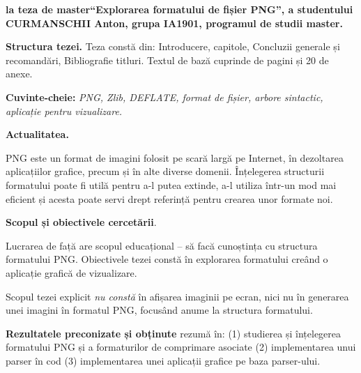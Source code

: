 \documentclass[a4paper,12pt]{report}
\newcommand{\authorName}{CURMANSCHII Anton}
\newcommand{\thesisTitle}{Explorarea formatului de fișier PNG}
\newcommand{\uniGroupName}{IA1901}
\newcommand{\thesisType}{master}
\newcommand{\programulDeStudii}{master}
\newcommand{\anexeCount}{20}
\begin{document}


\clearpage
\tableofcontents

\clearpage
{}
\begin{acronym}[RAII]
\end{acronym}


\clearpage
{}

\textbf{la teza de \thesisType ``\thesisTitle'', a studentului \authorName{}, grupa \uniGroupName{}, programul de studii \programulDeStudii.}

\textbf{Structura tezei.}
Teza constă din: Introducere,  capitole, Concluzii generale și recomandări, Bibliografie \bibliographyEntryCount{} titluri.
Textul de bază cuprinde \usefulPageCount{} de pagini și \anexeCount{} de anexe.

\textbf{Cuvinte-cheie:}
\textit{\ac{PNG}, Zlib, DEFLATE, format de fișier, arbore sintactic, aplicație pentru vizualizare.}

\textbf{Actualitatea.}

\ac{PNG} este un format de imagini folosit pe scară largă pe Internet,
în dezoltarea aplicațiilor grafice, precum și în alte diverse domenii.
Înțelegerea structurii formatului poate fi utilă pentru a-l putea extinde, 
a-l utiliza într-un mod mai eficient și acesta poate servi drept referință pentru 
crearea unor formate noi.

\textbf{Scopul și obiectivele cercetării}.

Lucrarea de față are scopul educațional -- să facă cunoștința cu structura formatului \ac{PNG}.
Obiectivele tezei constă în explorarea formatului creând o aplicație grafică de vizualizare.

Scopul tezei explicit \textit{nu constă} în afișarea imaginii pe ecran,
nici nu în generarea unei imagini în formatul PNG,
focusând anume la structura formatului.

\textbf{Rezultatele preconizate și obținute} rezumă în: 
(1) studierea și înțelegerea formatului \ac{PNG} și a formaturilor de comprimare asociate 
(2) implementarea unui parser în cod
(3) implementarea unei aplicații grafice pe baza parser-ului.
\end{document}
